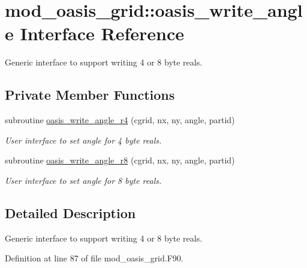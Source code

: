 \hypertarget{interfacemod__oasis__grid_1_1oasis__write__angle}{\section{mod\+\_\+oasis\+\_\+grid\+:\+:oasis\+\_\+write\+\_\+angle Interface Reference}
\label{interfacemod__oasis__grid_1_1oasis__write__angle}
}


Generic interface to support writing 4 or 8 byte reals.  


\subsection*{Private Member Functions}
\begin{DoxyCompactItemize}
\item 
subroutine \hyperlink{interfacemod__oasis__grid_1_1oasis__write__angle_ad29c223ca87f1f54d042bce0a9b9e90d}{oasis\+\_\+write\+\_\+angle\+\_\+r4} (cgrid, nx, ny, angle, partid)
\begin{DoxyCompactList}\small\item\em User interface to set angle for 4 byte reals. \end{DoxyCompactList}\item 
subroutine \hyperlink{interfacemod__oasis__grid_1_1oasis__write__angle_a82a80c2eeb39ddca783d7868d92b6f6d}{oasis\+\_\+write\+\_\+angle\+\_\+r8} (cgrid, nx, ny, angle, partid)
\begin{DoxyCompactList}\small\item\em User interface to set angle for 8 byte reals. \end{DoxyCompactList}\end{DoxyCompactItemize}


\subsection{Detailed Description}
Generic interface to support writing 4 or 8 byte reals. 

Definition at line 87 of file mod\+\_\+oasis\+\_\+grid.\+F90.



